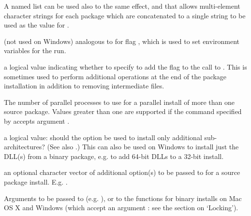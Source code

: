 \begin{Arguments}
\begin{ldescription}
A named list can be used also to the same effect, and that
allows multi-element character strings for each package
which are concatenated to a single string to be used as the
value for .

\item[\code{configure.vars}] 
(not used on Windows) analogous to  for flag
, which is used to set environment variables
for the  run. 

\item[\code{clean}] a logical value indicating whether to specify
to add the  flag to the call to
.
This is sometimes used to perform additional operations at the end
of the package installation in addition to removing intermediate files.

\item[\code{Ncpus}] The number of parallel processes to use for a parallel
install of more than one source package.  Values greater than one
are supported if the  command specified by
 accepts argument .

\item[\code{libs\_only}] 
a logical value: should the  option be used to
install only additional sub-architectures?  (See also
.)  This can also be used on Windows to install
just the DLL(s) from a binary package, e.g. to add 64-bit DLLs to a
32-bit install. 

\item[\code{INSTALL\_opts}] 
an optional character vector of additional option(s) to be passed to
 for a source package install.  E.g.
.

\item[\code{...}] 
Arguments to be passed to  (e.g.
), or to the functions for binary installs on Mac
OS X and Windows (which accept an argument : see the
section on `Locking').

\end{ldescription}
\end{Arguments}
%
